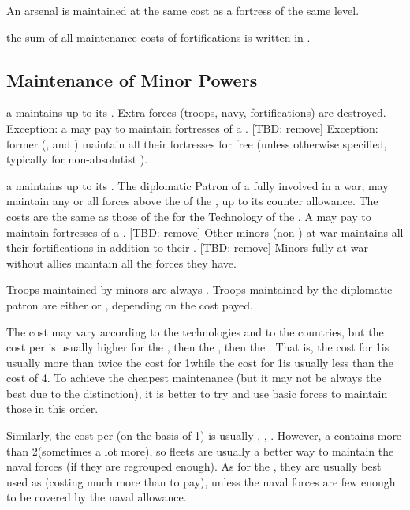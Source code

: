 \aparag[Arsenals] An arsenal is maintained at the same cost as a fortress of
the same level.

\aparag the sum of all maintenance costs of fortifications is written in
.




\subsection{Maintenance of Minor Powers}
\label{chLogistic:Maintenance of minors}
\aparag[At peace] a \MIN maintains up to its . Extra
forces (troops, navy, fortifications) are destroyed.
\bparag Exception: a \MAJ may pay to maintain fortresses of a \VASSAL. [TBD:
remove]
\bparag Exception: former \MAJ (\paysPortugal, \paysVenise and \paysPologne)
maintain all their fortresses for free (unless otherwise specified, typically
for non-absolutist \paysPologne).

\aparag[At war] a \MIN maintains up to its .
\bparag The diplomatic Patron of a \MIN fully involved in a war, may maintain
any or all forces above the  of the \MIN, up to its
counter allowance.
\bparag The costs are the same as those of the \MAJ for the Technology of the
\MIN.
\bparag A \MAJ may pay to maintain fortresses of a \VASSAL. [TBD: remove]
\bparag Other minors (non \VASSAL) at war maintains all their fortifications
in addition to their . [TBD: remove]
\bparag Minors fully at war without \MAJ allies maintain all the forces they
have.

\aparag[Moral] Troops maintained by minors are always .
\bparag Troops maintained by the diplomatic patron are either 
or , depending on the cost payed.

\begin{designnote} The cost may vary according to the
  technologies and to the countries, but the cost per \LD is usually higher
  for the \ARMY\facemoins, then the \LD, then the \ARMY\faceplus. That is, the
  cost for 1\ARMY\Facemoins is usually more than twice the cost for 1\LD while
  the cost for 1\ARMY\Faceplus is usually less than the cost of 4\LD. To
  achieve the cheapest maintenance (but it may not be always the best due to
  the  distinction), it is better to try and use basic forces
  to maintain those in this order.

  Similarly, the cost per \ND (on the basis of 1\FLEET{}\ND) is
  usually \FLEET\facemoins, \ND, \FLEET\faceplus. However, a \FLEET\facemoins
  contains more than 2\ND (sometimes a lot more), so fleets are usually a
  better way to maintain the naval forces (if they are regrouped enough). As
  for the \GD, they are usually best used as \ND (costing much more than \LD
  to pay), unless the naval forces are few enough to be covered by the naval
  allowance.
\end{designnote}

